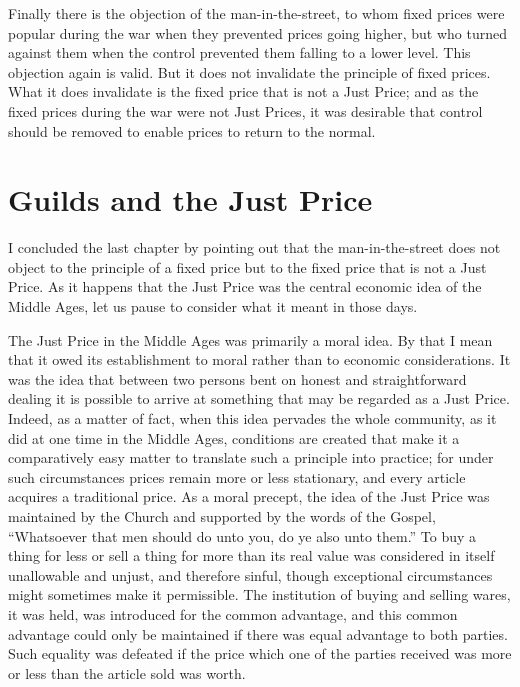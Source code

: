 \documentclass{book}
\begin{document}
Finally there is the objection of the man-in-the-street, to whom fixed prices were popular during the war when they prevented prices going higher, but who turned against them when the control prevented them falling to a lower level. This objection again is valid. But it does not invalidate the principle of fixed prices. What it does invalidate is the fixed price that is not a Just Price; and as the fixed prices during the war were not Just Prices, it was desirable that control should be removed to enable prices to return to the normal.

\chapter{Guilds and the Just Price}
\label{chapter-7}
I concluded the last chapter by pointing out that the man-in-the-street does not object to the principle of a fixed price but to the fixed price that is not a Just Price. As it happens that the Just Price was the central economic idea of the Middle Ages, let us pause to consider what it meant in those days.

The Just Price in the Middle Ages was primarily a moral idea. By that I mean that it owed its establishment to moral rather than to economic considerations. It was the idea that between two persons bent on honest and straightforward dealing it is possible to arrive at something that may be regarded as a Just Price. Indeed, as a matter of fact, when this idea pervades the whole community, as it did at one time in the Middle Ages, conditions are created that make it a comparatively easy matter to translate such a principle into practice; for under such circumstances prices remain more or less stationary, and every article acquires a traditional price. As a moral precept, the idea of the Just Price was maintained by the Church and supported by the words of the Gospel, “Whatsoever that men should do unto you, do ye also unto them.” To buy a thing for less or sell a thing for more than its real value was considered in itself unallowable and unjust, and therefore sinful, though exceptional circumstances might sometimes make it permissible. The institution of buying and selling wares, it was held, was introduced for the common advantage, and this common advantage could only be maintained if there was equal advantage to both parties. Such equality was defeated if the price which one of the parties received was more or less than the article sold was worth.
\end{document}
